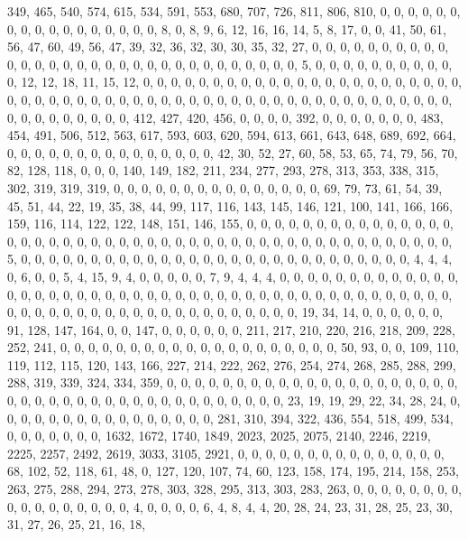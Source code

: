 \documentclass[
]{article}
\begin{document}
349, 465, 540, 574, 615, 534, 591, 553, 680, 707, 726, 811, 806, 810, 0,
0, 0, 0, 0, 0, 0, 0, 0, 0, 0, 0, 0, 0, 0, 0, 0, 8, 0, 8, 9, 6, 12, 16,
16, 14, 5, 8, 17, 0, 0, 41, 50, 61, 56, 47, 60, 49, 56, 47, 39, 32, 36,
32, 30, 30, 35, 32, 27, 0, 0, 0, 0, 0, 0, 0, 0, 0, 0, 0, 0, 0, 0, 0, 0,
0, 0, 0, 0, 0, 0, 0, 0, 0, 0, 0, 0, 0, 0, 0, 5, 0, 0, 0, 0, 0, 0, 0, 0,
0, 0, 0, 12, 12, 18, 11, 15, 12, 0, 0, 0, 0, 0, 0, 0, 0, 0, 0, 0, 0, 0,
0, 0, 0, 0, 0, 0, 0, 0, 0, 0, 0, 0, 0, 0, 0, 0, 0, 0, 0, 0, 0, 0, 0, 0,
0, 0, 0, 0, 0, 0, 0, 0, 0, 0, 0, 0, 0, 0, 0, 0, 0, 0, 0, 0, 0, 0, 0, 0,
0, 0, 0, 412, 427, 420, 456, 0, 0, 0, 0, 392, 0, 0, 0, 0, 0, 0, 0, 483,
454, 491, 506, 512, 563, 617, 593, 603, 620, 594, 613, 661, 643, 648,
689, 692, 664, 0, 0, 0, 0, 0, 0, 0, 0, 0, 0, 0, 0, 0, 0, 0, 42, 30, 52,
27, 60, 58, 53, 65, 74, 79, 56, 70, 82, 128, 118, 0, 0, 0, 140, 149,
182, 211, 234, 277, 293, 278, 313, 353, 338, 315, 302, 319, 319, 319, 0,
0, 0, 0, 0, 0, 0, 0, 0, 0, 0, 0, 0, 0, 0, 69, 79, 73, 61, 54, 39, 45,
51, 44, 22, 19, 35, 38, 44, 99, 117, 116, 143, 145, 146, 121, 100, 141,
166, 166, 159, 116, 114, 122, 122, 148, 151, 146, 155, 0, 0, 0, 0, 0, 0,
0, 0, 0, 0, 0, 0, 0, 0, 0, 0, 0, 0, 0, 0, 0, 0, 0, 0, 0, 0, 0, 0, 0, 0,
0, 0, 0, 0, 0, 0, 0, 0, 0, 0, 0, 0, 0, 0, 0, 0, 0, 5, 0, 0, 0, 0, 0, 0,
0, 0, 0, 0, 0, 0, 0, 0, 0, 0, 0, 0, 0, 0, 0, 0, 0, 0, 0, 0, 0, 0, 4, 4,
4, 0, 6, 0, 0, 5, 4, 15, 9, 4, 0, 0, 0, 0, 0, 7, 9, 4, 4, 4, 0, 0, 0, 0,
0, 0, 0, 0, 0, 0, 0, 0, 0, 0, 0, 0, 0, 0, 0, 0, 0, 0, 0, 0, 0, 0, 0, 0,
0, 0, 0, 0, 0, 0, 0, 0, 0, 0, 0, 0, 0, 0, 0, 0, 0, 0, 0, 0, 0, 0, 0, 0,
0, 0, 0, 0, 0, 0, 0, 0, 0, 0, 0, 0, 0, 0, 19, 34, 14, 0, 0, 0, 0, 0, 0,
91, 128, 147, 164, 0, 0, 147, 0, 0, 0, 0, 0, 0, 211, 217, 210, 220, 216,
218, 209, 228, 252, 241, 0, 0, 0, 0, 0, 0, 0, 0, 0, 0, 0, 0, 0, 0, 0, 0,
0, 0, 0, 0, 50, 93, 0, 0, 109, 110, 119, 112, 115, 120, 143, 166, 227,
214, 222, 262, 276, 254, 274, 268, 285, 288, 299, 288, 319, 339, 324,
334, 359, 0, 0, 0, 0, 0, 0, 0, 0, 0, 0, 0, 0, 0, 0, 0, 0, 0, 0, 0, 0, 0,
0, 0, 0, 0, 0, 0, 0, 0, 0, 0, 0, 0, 0, 0, 0, 0, 0, 0, 0, 0, 23, 19, 19,
29, 22, 34, 28, 24, 0, 0, 0, 0, 0, 0, 0, 0, 0, 0, 0, 0, 0, 0, 0, 0, 281,
310, 394, 322, 436, 554, 518, 499, 534, 0, 0, 0, 0, 0, 0, 0, 1632, 1672,
1740, 1849, 2023, 2025, 2075, 2140, 2246, 2219, 2225, 2257, 2492, 2619,
3033, 3105, 2921, 0, 0, 0, 0, 0, 0, 0, 0, 0, 0, 0, 0, 0, 0, 0, 68, 102,
52, 118, 61, 48, 0, 127, 120, 107, 74, 60, 123, 158, 174, 195, 214, 158,
253, 263, 275, 288, 294, 273, 278, 303, 328, 295, 313, 303, 283, 263, 0,
0, 0, 0, 0, 0, 0, 0, 0, 0, 0, 0, 0, 0, 0, 0, 0, 4, 0, 0, 0, 0, 6, 4, 8,
4, 4, 20, 28, 24, 23, 31, 28, 25, 23, 30, 31, 27, 26, 25, 21, 16, 18,
\end{document}
